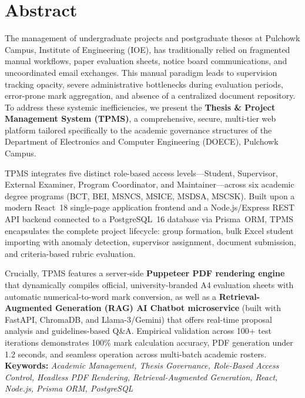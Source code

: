 \documentclass[12pt]{report}
\begin{document}
\chapter*{Abstract}

The management of undergraduate projects and postgraduate theses at Pulchowk Campus, Institute of Engineering (IOE), has traditionally relied on fragmented manual workflows, paper evaluation sheets, notice board communications, and uncoordinated email exchanges. This manual paradigm leads to supervision tracking opacity, severe administrative bottlenecks during evaluation periods, error-prone mark aggregation, and absence of a centralized document repository. To address these systemic inefficiencies, we present the \textbf{Thesis \& Project Management System (TPMS)}, a comprehensive, secure, multi-tier web platform tailored specifically to the academic governance structures of the Department of Electronics and Computer Engineering (DOECE), Pulchowk Campus.

TPMS integrates five distinct role-based access levels---Student, Supervisor, External Examiner, Program Coordinator, and Maintainer---across six academic degree programs (BCT, BEI, MSNCS, MSICE, MSDSA, MSCSK). Built upon a modern React~18 single-page application frontend and a Node.js/Express REST API backend connected to a PostgreSQL~16 database via Prisma~ORM, TPMS encapsulates the complete project lifecycle: group formation, bulk Excel student importing with anomaly detection, supervisor assignment, document submission, and criteria-based rubric evaluation.

Crucially, TPMS features a server-side \textbf{Puppeteer PDF rendering engine} that dynamically compiles official, university-branded A4 evaluation sheets with automatic numerical-to-word mark conversion, as well as a \textbf{Retrieval-Augmented Generation (RAG) AI Chatbot microservice} (built with FastAPI, ChromaDB, and Llama-3/Gemini) that offers real-time proposal analysis and guidelines-based Q\&A. Empirical validation across 100+ test iterations demonstrates 100\% mark calculation accuracy, PDF generation under 1.2 seconds, and seamless operation across multi-batch academic rosters.\\

\textbf{Keywords:} \textit{Academic Management, Thesis Governance, Role-Based Access Control, Headless PDF Rendering, Retrieval-Augmented Generation, React, Node.js, Prisma ORM, PostgreSQL}
\end{document}
